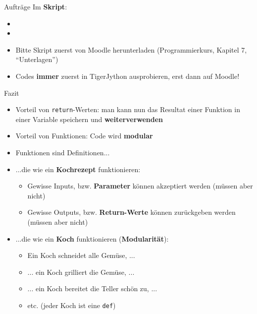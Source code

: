 \begin{frame}[fragile]{Aufträge}
Im \textbf{Skript}:
\begin{itemize}
\item {}
\item {}
\end{itemize}
\begin{mycaution}
\begin{itemize}
\item \faFilePdf{} Bitte Skript zuerst von Moodle herunterladen (Programmierkurs, Kapitel 7, ``Unterlagen'')
\item Codes \textbf{immer} zuerst in TigerJython ausprobieren, erst dann auf Moodle!
\end{itemize}
\end{mycaution}
\end{frame}

\begin{frame}{Fazit}
\begin{itemize}[<+->]
	\item {} Vorteil von \lstinline|return|-Werten: man kann nun das Resultat einer Funktion in einer Variable speichern und \textbf{weiterverwenden}
	\item {} Vorteil von Funktionen: Code wird \textbf{modular}
	\item Funktionen sind Definitionen...
	\item {} ...die wie ein \textbf{Kochrezept} funktionieren:
	\begin{itemize}
		\item {}   Gewisse Inputs, bzw. \textbf{Parameter} können akzeptiert werden (müssen aber nicht)
		\item {} Gewisse Outputs, bzw. \textbf{Return-Werte }können zurückgeben werden (müssen aber nicht)
	\end{itemize}
	\item {} ...die wie ein \textbf{Koch} funktionieren (\textbf{Modularität}):
	\begin{itemize}
		\item Ein Koch schneidet alle Gemüse, ...
		\item ... ein Koch grilliert die Gemüse, ...
		\item ... ein Koch bereitet die Teller schön zu, ...
		\item etc. (jeder Koch ist eine \lstinline|def|)
	\end{itemize}
\end{itemize}
\end{frame}